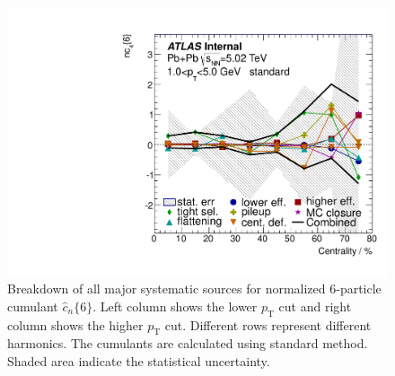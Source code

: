 \begin{figure}[H]
\includegraphics[width=.425\linewidth]{figs/sec_sys/summary/sys_nc6_1sub_Har4_Pt1.pdf}
\caption{Breakdown of all major systematic sources for normalized 6-particle cumulant $\hat{c}_n\{6\}$. Left column shows the lower $p_\text{T}$ cut and right column shows the higher $p_\text{T}$ cut. Different rows represent different harmonics. The cumulants are calculated using standard method. Shaded area indicate the statistical uncertainty.}
\label{fig:sys_sum_nc6}
\end{figure}

